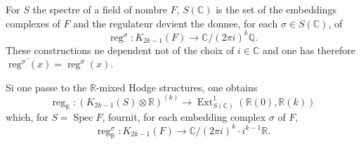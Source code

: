 \documentclass[12pt,a4paper]{article}
\theoremstyle{plain}
\theoremstyle{definition}
\theoremstyle{remark}
\DeclareMathOperator{\Ext}{Ext}
\DeclareMathOperator{\reg}{reg}
\DeclareMathOperator{\Spec}{Spec}
\newcommand{\Q}{\mathbb{Q}}
\newcommand{\R}{\mathbb{R}}
\newcommand{\C}{\mathbb{C}}
\begin{document}
For $S$ the spectre of a field of nombre $F$, $S(\C)$ is the set of the embeddings complexes of $F$ and the r{e}gulateur devient the donn{e}e, for each $\sigma\in S(\C)$, of
\begin{equation*}
\reg^\sigma : K_{2k-1}(F) \longrightarrow \C/(2\pi i)^k\Q.
\end{equation*}
These constructions ne d{e}pendent not of the choix of $i\in\C$ and one has therefore $\overline{\reg^\sigma(x)}=\reg^{\bar{\sigma}}(x)$.

Si one passe to the $\R$-mixed Hodge structures, one obtains
\begin{equation*}
\reg_\R : (K_{2k-1}(S)\otimes\R)^{(k)} \longrightarrow \Ext^1_{S(\C)}(\R(0),\R(k))
\end{equation*}
which, for $S=\Spec F$, fournit, for each embedding complex $\sigma$ of $F$,
\begin{equation*}
\reg_\R^\sigma : K_{2k-1}(F) \longrightarrow \C/(2\pi i)^k\cdot i^{k-1}\R.
\end{equation*}
\end{document}
